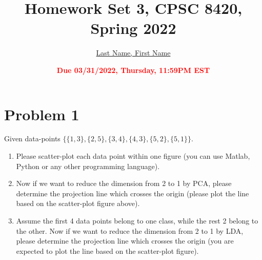 \documentclass[11pt]{article}
\title{{\bf Homework Set 3, CPSC 8420, Spring 2022}} %
\author{\Large\underline{Last Name, First Name}}
\date{\textbf{\Large\textcolor{red}{Due 03/31/2022, Thursday, 11:59PM EST}}} %
\newcommand{\minimize}{\operatorname*{minimize\ }}
\newcommand{\mtx}[1]{\mathbf{#1}}
\def \mA {\mtx{A}}
\def \mG {\mtx{G}}
\def \mX {\mtx{X}}
\def \mY {\mtx{Y}}
\def \mZ {\mtx{Z}}
\begin{document}
\maketitle

\section*{Problem 1}
Given data-points $\{\{1,3\},\{2,5\},\{3,4\},\{4,3\},\{5,2\},\{5,1\}\}$.
\begin{enumerate}
	\item Please scatter-plot each data point within one figure (you can use Matlab, Python or any other programming language).
	\item Now if we want to reduce the dimension from 2 to 1 by PCA, please determine the projection line which crosses the origin (please plot the line based on the scatter-plot figure above).
	\item Assume the first 4 data points belong to one class, while the rest 2 belong to the other. Now if we want to reduce the dimension from 2 to 1 by LDA, please determine the projection line which crosses the origin (you are expected to plot the line based on the scatter-plot figure).
\end{enumerate}

\end{document}
